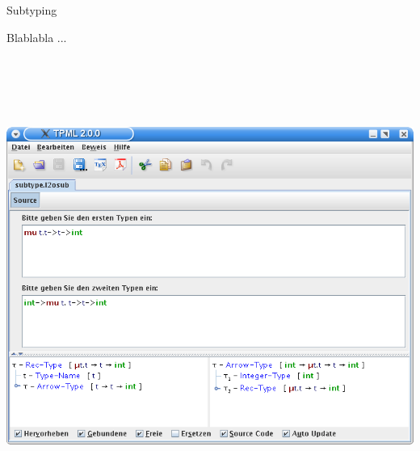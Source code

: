 {
  \begin{itemgroup}{Subtyping}
    \item Blablabla ...
  \end{itemgroup}
}

{
  \begin{center}
    \includegraphics[height=15cm]{images/subtype.png}
  \end{center}
}